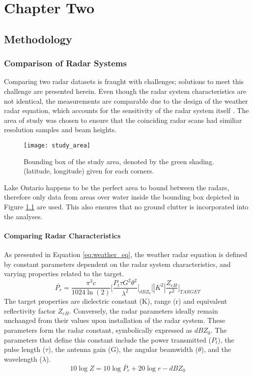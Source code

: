 \chapter{Chapter Two}
\section{Methodology}
\subsection{Comparison of Radar Systems}
Comparing two radar datasets is fraught with challenges; solutions to meet this challenge are presented herein. Even though the radar system characteristics are not identical, the measurements are comparable due to the design of the weather radar equation, which accounts for the sensitivity of the radar system itself \citep{Rogers1989}. The area of study was chosen to ensure that the coinciding radar scans had similiar resolution samples and beam heights. 
\begin{figure}[h]
\texttt{[image: study\_area]}\centering
\caption{Bounding box of the study area, denoted by the green shading. (latitude, longitude) given for each corners.} 
\label{fig:study_area}
\end{figure}
Lake Ontario happens to be the perfect area to bound between the radars, therefore only data from areas over water inside the bounding box depicted in Figure \ref{fig:study_area} are used. This also ensures that no ground clutter is incorporated into the analyses.
\subsubsection{Comparing Radar Characteristics}

As presented in Equation \ref{eq:weather_eq}, the weather radar equation is defined by constant parameters dependent on the radar system characteristics, and varying properties related to the target. 
\begin{equation}\label{eq:weather_eq}
\bar{P_r} = \frac{\pi^3c}{1024 \ln(2)} \Bigg[\frac{P_t \tau G^2 \theta^2}{\lambda^2}\Bigg]_{dBZ_0} \Bigg[|K^2|\frac{Z_{eH}}{r^2}\Bigg]_{TARGET}
\end{equation}
The target properties are dielectric constant (K), range (r) and equivalent reflectivity factor $Z_{eH}$. Conversely, the radar parameters ideally remain unchanged from their values upon installation of the radar system. These parameters form the radar constant, symbolically expressed as $dBZ_0$. The parameters that define this constant include the power transmitted ($P_t$), the pulse length ($\tau$), the antenna gain (G), the angular beamwidth ($\theta$), and the wavelength ($\lambda$).
\begin{equation}\label{eq:radpow}
10 \log Z = 10 \log{\bar{P_r}} + 20 \log r - dBZ_0
\end{equation}

